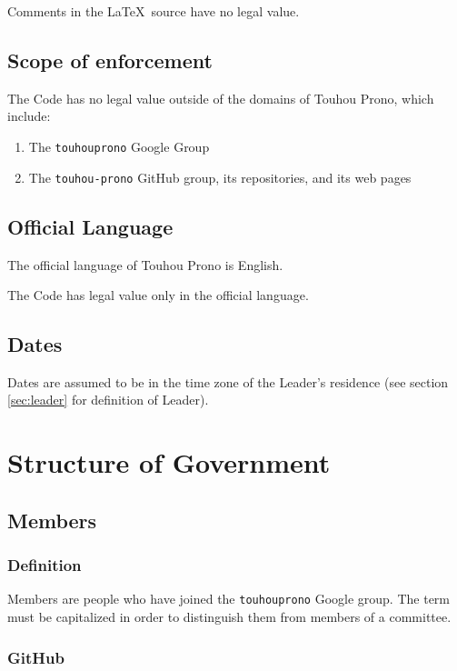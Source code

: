 \documentclass[10pt]{book}
\begin{document}
Comments in the \LaTeX\ source have no legal value.

\section{Scope of enforcement}

The Code has no legal value outside of the domains of Touhou Prono, which include:

\begin{enumerate}
 \item The \texttt{touhouprono} Google Group
 \item The \texttt{touhou-prono} GitHub group, its repositories, and its web pages
\end{enumerate}

\section{Official Language}

The official language of Touhou Prono is English.

The Code has legal value only in the official language.

\section{Dates}

Dates are assumed to be in the time zone of the Leader's residence (see section \ref{sec:leader} for definition of Leader).

\chapter{Structure of Government}

\section{Members}

\subsection{Definition}

Members are people who have joined the \texttt{touhouprono} Google group. The term must be capitalized in order to distinguish them from members of a committee.

\subsection{GitHub}
\end{document}
